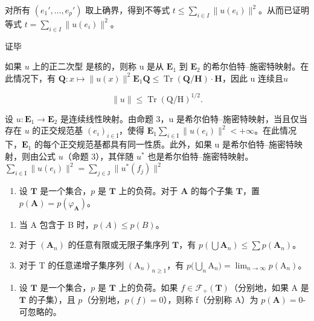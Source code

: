对所有 \((e_1', \ldots, e_p')\) 取上确界，得到不等式 \(t \leqslant \sum_{i \in I} \| u(e_i) \|^2\)。从而已证明等式 \(t = \sum_{i \in I} \| u(e_i) \|^2\)。

证毕

如果 \(u\) 上的正二次型  是核的，则称 u 是从 \(\mathbf{E}_1\) 到 \(\mathbf{E}_2\) 的希尔伯特--施密特映射。在此情况下，有 \(\mathbf{Q}: x \mapsto \| u(x) \|^2\)\(\mathbf{E}_1\)\(\mathbf{Q} \leqslant \operatorname{Tr}(\mathbf{Q}/\mathbf{H}) \cdot \mathbf{H}\)，因此 u 连续且\(u\)

\[
\| u \| \leqslant \operatorname{Tr} (\mathrm{Q/H}) ^ {1 / 2}.
\]

设 \(u: \mathbf{E}_1 \to \mathbf{E}_2\) 是连续线性映射。由命题 3，u 是希尔伯特--施密特映射，当且仅当存在 \(u\) 的正交规范基 \((e_i)_{i \in \mathrm{I}}\)，使得 \(\mathbf{E}_1\)\(\sum_{i \in \mathrm{I}} \|u(e_i)\|^2 < +\infty\)。在此情况下，\(\mathbf{E}_1\) 的每个正交规范基都具有同一性质。此外，如果 u 是希尔伯特--施密特映射，则由公式 \(u\)（命题 3），其伴随 \(u^*\) 也是希尔伯特--施密特映射。\(\sum_{i \in \mathrm{I}} \|u(e_i)\|^2 = \sum_{j \in \mathrm{J}} \|u^*(f_j)\|^2\)


\exercisesection{}

\begin{enumerate}
\def\labelenumi{\arabic{enumi})}
\tightlist
\item
  设 \(\mathbf{T}\) 是一个集合，\(p\) 是 \(\mathbf{T}\) 上的负荷。对于 \(\mathbf{A}\) 的每个子集 \(\mathbf{T}\)，置 \(p(\mathbf{A}) = p(\varphi_{\mathbf{A}})\)。
\end{enumerate}

\begin{enumerate}
\def\labelenumi{\alph{enumi})}
\item
  当 A 包含于 B 时，\(p(A) \leqslant p(B)\)。
\item
  对于 \((\mathbf{A}_n)\) 的任意有限或无限子集序列 \(\mathbf{T}\)，有 \(p(\bigcup \mathbf{A}_n) \leqslant \sum p(\mathbf{A}_n)\)。
\item
  对于 T 的任意递增子集序列 \((\mathrm{A}_n)_{n\geqslant 1}\)，有 \(p\big(\bigcup_{n}\mathrm{A}_{n}\big) = \lim_{n\to \infty}p(\mathrm{A}_n)\)。
\end{enumerate}

\begin{enumerate}
\def\labelenumi{\arabic{enumi})}
\setcounter{enumi}{1}
\tightlist
\item
  设 \(\mathbf{T}\) 是一个集合，\(p\) 是 \(\mathbf{T}\) 上的负荷。如果 \(f \in \mathcal{F}_{+}(\mathbf{T})\)（分别地，如果 A 是 \(\mathbf{T}\) 的子集），且 \(p\)（分别地，\(p(f) = 0\)），则称 f（分别称 A）为 \(p(\mathbf{A}) = 0\)-可忽略的。
\end{enumerate}

